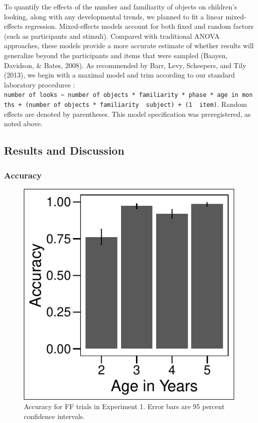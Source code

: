 \documentclass[english,,man]{apa6}
\begin{document}
To quantify the effects of the number and familiarity of objects on
children's looking, along with any developmental trends, we planned to
fit a linear mixed-effects regression. Mixed-effects models account for
both fixed and random factors (such as participants and stimuli).
Compared with traditional ANOVA approaches, these models provide a more
accurate estimate of whether results will generalize beyond the
participants and items that were sampled (Baayen, Davidson, \& Bates,
2008). As recommended by Barr, Levy, Scheepers, and Tily (2013), we
begin with a maximal model and trim according to our standard laboratory
procedures :
\texttt{number\ of\ looks\ \textasciitilde{}\ number\ of\ objects\ *\ familiarity\ *\ phase\ *\ age\ in\ months\ +\ (number\ of\ objects\ *\ familiarity\ \textbar{}\ subject)\ +\ (1\ \textbar{}\ item)}.
Random effects are denoted by parentheses. This model specification was
preregistered, as noted above.

\subsection{Results and Discussion}\label{results-and-discussion}

\subsubsection{Accuracy}\label{accuracy}

\begin{figure}
\centering
\includegraphics{figs/acce1-1.pdf}
\caption{\label{fig:acce1}Accuracy for FF trials in Experiment 1. Error bars
are 95 percent confidence intervals.}
\end{figure}
\end{document}
